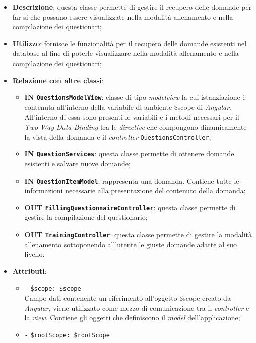 \begin{itemize}
	\item \textbf{Descrizione}: questa classe permette di gestire il recupero delle domande per far si che possano essere visualizzate nella modalità allenamento e nella compilazione dei questionari;
	\item \textbf{Utilizzo}: fornisce le funzionalità per il recupero delle domande esistenti nel database al fine di poterle visualizzare nella modalità allenamento e nella compilazione dei questionari;
	\item \textbf{Relazione con altre classi}:
	\begin{itemize}
		\item \textbf{IN \texttt{QuestionsModelView}}: classe di tipo \textit{modelview} la cui istanziazione è contenuta all'interno della variabile di ambiente \$scope di \textit{Angular}. All'interno di essa sono presenti le variabili e i metodi necessari per il \textit{Two-Way Data-Binding} tra le \textit{directive} che compongono dinamicamente la vista della domanda e il \textit{controller} \texttt{QuestionsController};
		\item \textbf{IN \texttt{QuestionServices}}: questa classe permette di ottenere domande esistenti e salvare nuove domande;
		\item \textbf{IN \texttt{QuestionItemModel}}: rappresenta una domanda. Contiene tutte le informazioni necessarie alla presentazione del contenuto della domanda;
		\item \textbf{OUT \texttt{FillingQuestionnaireController}}: questa classe permette di gestire la compilazione del questionario;
		\item \textbf{OUT \texttt{TrainingController}}: questa classe permette di gestire la modalità allenamento sottoponendo all'utente le giuste domande adatte al suo livello.
	\end{itemize}
	\item \textbf{Attributi}:
	\begin{itemize}
		\item \texttt{-} \texttt{\$scope: \$scope} \\
		Campo dati contenente un riferimento all'oggetto \$scope creato da \textit{Angular}, viene utilizzato come mezzo di comunicazione tra il \textit{controller} e la \textit{view}. Contiene gli oggetti che definiscono il \textit{model} dell'applicazione;
		\item \texttt{-} \texttt{\$rootScope: \$rootScope} \\

\end{itemize}
\end{itemize}
